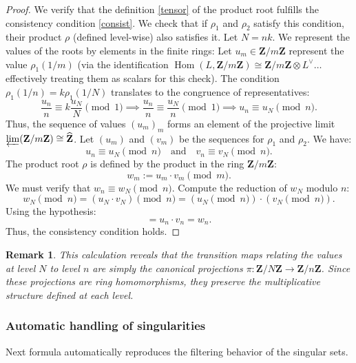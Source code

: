 \documentclass[11pt,a4paper]{article}
\newcommand{\Z}{\mathbf{Z}}
\theoremstyle{plain}
\newtheorem{rem}[thm]{Remark}
\theoremstyle{definition} %
\begin{document}
\begin{proof} We verify that the definition \eqref{tensor} of the product root fulfills the consistency condition \eqref{consist}. 
We check that if $\rho_1$ and $\rho_2$ satisfy this condition, their product $\rho$ (defined level-wise) also satisfies it.
Let $N = nk$.
We represent the values of the roots by elements in the finite rings:
Let $u_m \in \Z/m\Z$ represent the value $\rho_1(1/m)$ (via the identification $\operatorname{Hom}(L, \Z/m\Z) \cong \Z/m\Z \otimes L^\vee \dots$ effectively treating them as scalars for this check).
The condition $\rho_1(1/n) = k \rho_1(1/N)$ translates to the congruence of representatives:
\[
\frac{u_n}{n} \equiv k \frac{u_N}{N} \pmod 1 \implies \frac{u_n}{n} \equiv \frac{u_N}{n} \pmod 1 \implies u_n \equiv u_N \pmod n.
\]
Thus, the sequence of values $(u_m)_m$ forms an element of the projective limit $\varprojlim (\Z/m\Z) \cong \widehat{\Z}$.
Let $(u_m)$ and $(v_m)$ be the sequences for $\rho_1$ and $\rho_2$.
We have:
\[
u_n \equiv u_N \pmod n \quad \text{and} \quad v_n \equiv v_N \pmod n.
\]
The product root $\rho$ is defined by the product in the ring $\Z/m\Z$:
\[
w_m := u_m \cdot v_m \pmod m.
\]
We must verify that $w_n \equiv w_N \pmod n$.
Compute the reduction of $w_N$ modulo $n$:
\[
w_N \pmod n = (u_N \cdot v_N) \pmod n = (u_N \pmod n) \cdot (v_N \pmod n).
\]
Using the hypothesis:
\[
=u_n \cdot v_n = w_n.
\]
Thus, the consistency condition holds.
\end{proof}

\begin{rem}
This calculation reveals that the transition maps relating the values at level $N$ to level $n$ are simply the canonical projections $\pi: \Z/N\Z \to \Z/n\Z$. Since these projections are ring homomorphisms, they preserve the multiplicative structure defined at each level.
\end{rem}

\subsubsection{Automatic handling of singularities}

Next formula automatically reproduces the filtering behavior of the singular sets.\vspace{.05in}
\end{document}
